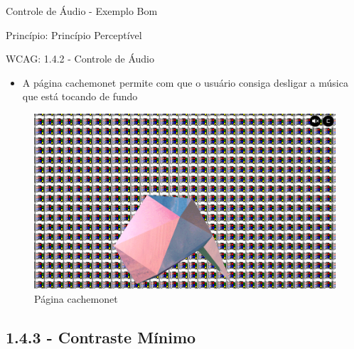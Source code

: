 \documentclass{beamer}
\begin{document}
\begin{frame}{Controle de Áudio - Exemplo Bom}

Princípio: Princípio Perceptível

WCAG: 1.4.2 - Controle de Áudio

\begin{itemize}
	\item A página cachemonet permite com que o usuário consiga desligar a música que está tocando de fundo
\end{itemize}
\begin{figure}
    \centering
    \includegraphics[scale=0.2]{images/no_audio.png}
    \caption{Página cachemonet}
\end{figure}
\end{frame}

\subsection{1.4.3 - Contraste Mínimo}
\end{document}
